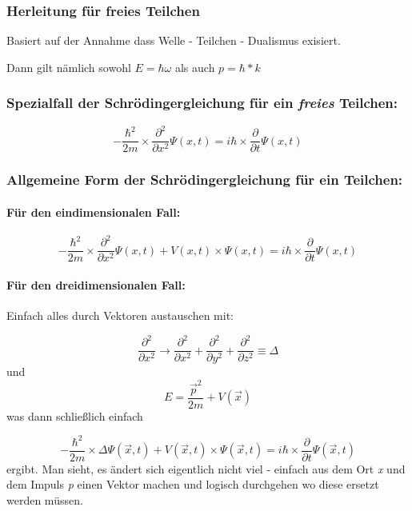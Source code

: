 \subsubsection{Herleitung für freies Teilchen}
Basiert auf der Annahme dass Welle - Teilchen - Dualismus exisiert. 

Dann gilt nämlich sowohl $E = \hbar \omega$ als auch $p = \hbar * k$

\subsubsection{Spezialfall der Schrödingergleichung für ein \textit{freies} Teilchen:}
\begin{equation}
    -\frac{\hbar^2}{2m} \times \frac{\partial^2}{\partial x^2} \Psi(x,t)  = i \hbar \times \frac{\partial}{\partial t} \Psi(x,t)
\end{equation}

\subsubsection{Allgemeine Form der Schrödingergleichung für ein Teilchen:}

\paragraph{Für den eindimensionalen Fall:}
\begin{equation}
    -\frac{\hbar^2}{2m} \times \frac{\partial^2}{\partial x^2} \Psi(x,t) + V(x,t) \times \Psi(x,t) = i \hbar \times \frac{\partial}{\partial t} \Psi(x,t)
\end{equation}

\paragraph{Für den dreidimensionalen Fall:}

Einfach alles durch Vektoren austauschen mit: 

\begin{equation}
    \frac{\partial^2}{\partial x^2} \longrightarrow \frac{\partial^2}{\partial x^2} + \frac{\partial^2}{\partial y^2} + \frac{\partial^2}{\partial z^2} \equiv \Delta
\end{equation}
und 
\begin{equation}
    E = \frac{\vec{p}^2}{2m} + V(\vec{x})
\end{equation}
was dann schließlich einfach

\begin{equation}
    -\frac{\hbar^2}{2m} \times \Delta \Psi(\vec{x},t) + V(\vec{x},t) \times \Psi(\vec{x},t) = i \hbar \times \frac{\partial}{\partial t} \Psi(\vec{x},t)
\end{equation}
ergibt. Man sieht, es ändert sich eigentlich nicht viel - einfach aus dem Ort \textit{x} und dem Impuls \textit{p} einen Vektor machen und logisch durchgehen wo diese ersetzt werden müssen. 

